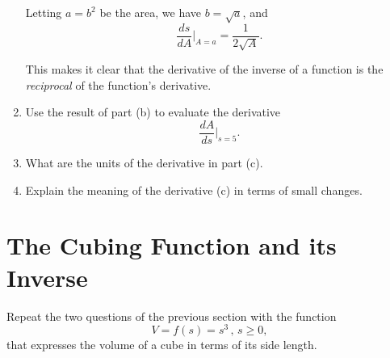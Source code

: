 \documentclass{ximera}
\begin{document}
\begin{question}
\begin{enumerate}
\begin{explanation}
Letting $a = b^2$ be the area, we have $b=\sqrt{a}$, and
\[
  \frac{ds}{dA}\Big|_{A=a} = \frac{1}{2\sqrt{A}}.
\]

This makes it clear that the derivative of the inverse of a function is the \emph{reciprocal} of the function's derivative.

\end{explanation}


\item Use the result of part (b) to evaluate the derivative
\[
   \frac{dA}{ds}\Big|_{s=5}.
\]

\item What are the units of the derivative in part (c).

\item Explain the meaning of the derivative (c) in terms of small changes.


\end{enumerate}
\end{question}

\section{The Cubing Function and its Inverse}

\begin{question} \label{QRDFGGERE}
Repeat the two questions of the previous section with the function
\[
    V = f(s) = s^3 \, , \, s\geq 0 ,
\]
that expresses the volume of a cube in terms of its side length.
\end{question}
\end{document}
